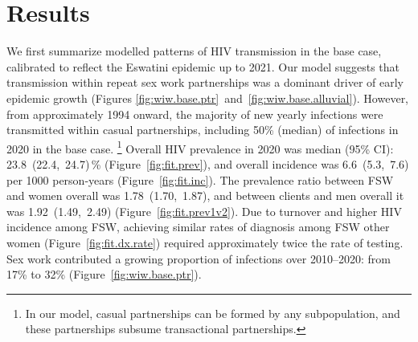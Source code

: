 \section{Results}\label{art.res}
We first summarize modelled patterns of HIV transmission in the base case,
calibrated to reflect the Eswatini epidemic up to 2021.
Our model suggests that transmission within repeat sex work partnerships
was a dominant driver of early epidemic growth
(Figures \ref{fig:wiw.base.ptr}~and~\ref{fig:wiw.base.alluvial}).
However, from approximately 1994 onward,
the majority of new yearly infections were transmitted within casual partnerships, %
including 50\% (median) of infections in 2020 in the base case.%
\footnote{In our model, casual partnerships can be formed by any subpopulation,
  and these partnerships subsume transactional partnerships.}
Overall HIV prevalence in 2020 was median (95\% CI):
23.8~(22.4,~24.7)\,\% (Figure~\ref{fig:fit.prev}), %
and overall incidence was 6.6~(5.3,~7.6) per 1000 person-years (Figure~\ref{fig:fit.inc}).
The prevalence ratio between FSW and women overall was 1.78~(1.70,~1.87), %
and between clients and men overall it was 1.92~(1.49,~2.49) %
(Figure~\ref{fig:fit.prev1v2}).
Due to turnover and higher HIV incidence among FSW,
achieving similar rates of diagnosis among FSW \vs other women (Figure~\ref{fig:fit.dx.rate})
required approximately twice the rate of testing. %
Sex work contributed a growing proportion of infections
over 2010--2020: from 17\% to 32\% (Figure~\ref{fig:wiw.base.ptr}). %
